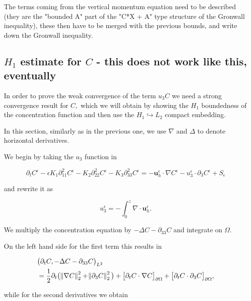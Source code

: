\documentclass[11pt]{article}
\begin{document}
The terms coming from the vertical momentum equation need to be described (they are the "bounded A" part of the "C*X + A" type structure of the Gronwall inequality), these then have to be merged with the previous bounds, and write down the Gronwall inequality.


\subsection{$H_1$ estimate for $C$ - this does not work like this, eventually}

In order to prove the weak convergence of the term $u_3 C$ we need a strong convergence result for $C,$ which we will obtain by showing the $H_1$ boundedness of the concentration function and then use the $H_1 \hookrightarrow L_2$ compact embedding.

In this section, similarly as in the previous one, we use $\nabla$ and $\Delta$ to denote horizontal derivatives.

We begin by taking the $u_3$ function in

\begin{equation}
  \partial_t C^\epsilon - \epsilon K_1 \partial_{11} ^ 2 C^\epsilon - K_2 \partial_{22} ^ 2 C^\epsilon - K_3 \partial_{33} ^ 2 C^\epsilon = - \mathbf{u}_h^\epsilon \cdot \nabla C^\epsilon - u_3^\epsilon \cdot \partial_3 C^\epsilon + S_\epsilon
\end{equation}

and rewrite it as

$$ u^\epsilon_3 = - \int_0^z \nabla \cdot \mathbf{u}^\epsilon_h.$$

We multiply the concentration equation by $-\Delta C - \partial_{33} C$ and integrate on $\Omega.$

On the left hand side for the first term this results in 

\begin{equation}
  \begin{split}
  & \big ( \partial_t C, -\Delta C -\partial_{33} C \big) _{L^2} \\
  & = \frac{1}{2} \partial_t \big ( \norm{\nabla C}_2^2 + \norm{\partial_3 C}_2^2 \big) + \big \lbrack \partial_t C \cdot \nabla C \big \rbrack_{\partial \Omega} + \big \lbrack \partial_t C \cdot \partial_3 C \big \rbrack_{\partial \Omega},
  \end{split}
\end{equation}

while for the second derivatives we obtain
\end{document}
